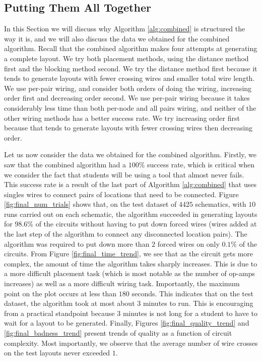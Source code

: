 \subsection{Putting Them All Together}
\label{sec:method_combination}

In this Section we will discuss why Algorithm
\ref{alg:combined} is structured the way it is, and we will also
discuss the data we obtained for the combined algorithm. Recall that the combined
algorithm makes four attempts at generating a complete layout. We try both
placement methods, using the distance method first and the blocking method
second. We
try the distance method first because it tends to generate layouts with fewer
crossing wires and smaller total wire length. We use per-pair wiring, and
consider both orders of doing the wiring, increasing order first and decreasing
order second. We use per-pair wiring because it takes considerably
less time than both per-node and all pairs wiring, and neither of the other
wiring methods has a better success rate. We try increasing order first because
that tends to generate layouts with fewer crossing wires then decreasing order.

Let us now consider the data we obtained for the combined algorithm. Firstly, we
saw that the combined algorithm had a $100\%$ success rate, which is critical
when we consider the fact that students will be using a tool that almost never
fails. This success rate is a result of the last part of Algorithm
\ref{alg:combined} that uses singles wires to connect pairs of locations that
need to be connected.
Figure \ref{fig:final_num_trials} shows that, on the test dataset of $4425$
schematics, with $10$ runs carried out on each schematic, the algorithm succeeded
in generating layouts for $98.6\%$ of the circuits without having to put down
forced wires (wires added at the last step of the algorithm to connect any
disconnected location pairs). The algorithm was
required to put down more than $2$ forced wires on only $0.1\%$ of the circuits.
From Figure
\ref{fig:final_time_trend}, we see that as the circuit gets more complex, the
amount of time the algorithm takes sharply increases. This is due to a more
difficult placement task (which is most notable as the number of op-amps
increases) as well as a more
difficult wiring task. Importantly, the maximum
point on the plot occurs at less than $180$ seconds. This indicates that on the
test dataset, the algorithm took at most about $3$ minutes to run. This is
encouraging from a practical standpoint because $3$ minutes is not long
for a student to have to wait for a layout to be generated.
Finally, Figures \ref{fig:final_quality_trend} and \ref{fig:final_badness_trend}
present trends of quality as a
function of circuit complexity. Most importantly, we observe that the average
number of wire crosses on the test layouts never exceeded $1$.

